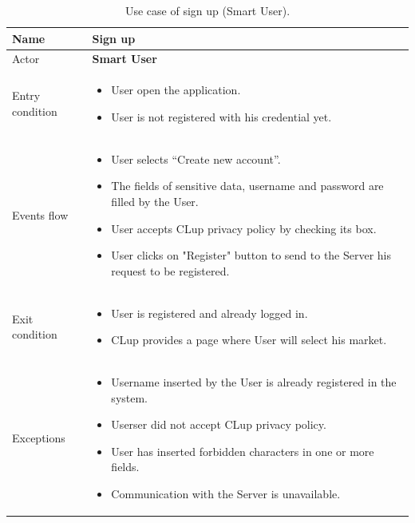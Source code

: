 \bigbreak
\begin{table}[H]\begin{tabular}{|p{5cm} | p{7cm} | }
	\hline
	Name & \textbf{Sign up} \\
	\hline
	Actor & \textbf{Smart User} \\
	\hline
	Entry condition &
	\begin{itemize}
		\item User open the application.
        \item User is not registered with his credential yet. 
	\end{itemize} \\
	\hline
	Events flow & 
	\begin{itemize}
		\item User selects “Create new account”.
		\item The fields of sensitive data, username and password are filled by the User.
		\item User accepts CLup privacy policy by checking its box.
		\item User clicks on "Register" button to send to the Server his request to be registered.
	\end{itemize} \\
	\hline
	Exit condition & \begin{itemize} 
    \item User is registered and already logged in. 
    \item CLup provides a page where User will select his market.
    \end{itemize}\\
	\hline 
	Exceptions &
	\begin{itemize}
		\item Username inserted by the User is already registered in the system.
		\item Userser did not accept CLup privacy policy.
		\item User has inserted forbidden characters in one or more fields.
        \item Communication with the Server is unavailable.
	\end{itemize} \\
	\hline
\end{tabular}
\caption{Use case of sign up (Smart User).}
\end{table}

\bigbreak

